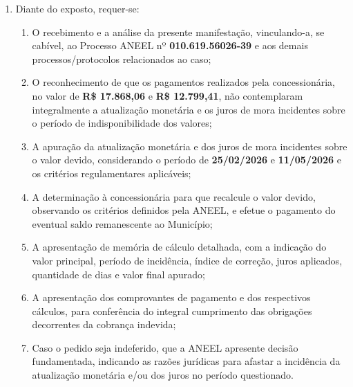 \begin{enumerate}[resume]
\item Diante do exposto, requer-se:
    \begin{enumerate}
    \item O recebimento e a análise da presente manifestação, vinculando-a, se cabível, ao Processo ANEEL nº \textbf{010.619.56026-39} e aos demais processos/protocolos relacionados ao caso;

    \item O reconhecimento de que os pagamentos realizados pela concessionária, no valor de \textbf{R\$ 17.868,06} e \textbf{R\$ 12.799,41}, não contemplaram integralmente a atualização monetária e os juros de mora incidentes sobre o período de indisponibilidade dos valores;

    \item A apuração da atualização monetária e dos juros de mora incidentes sobre o valor devido, considerando o período de \textbf{25/02/2026} e \textbf{11/05/2026} e os critérios regulamentares aplicáveis;

    \item A determinação à concessionária para que recalcule o valor devido, observando os critérios definidos pela ANEEL, e efetue o pagamento do eventual saldo remanescente ao Município;

    \item A apresentação de memória de cálculo detalhada, com a indicação do valor principal, período de incidência, índice de correção, juros aplicados, quantidade de dias e valor final apurado;

    \item A apresentação dos comprovantes de pagamento e dos respectivos cálculos, para conferência do integral cumprimento das obrigações decorrentes da cobrança indevida;

    \item Caso o pedido seja indeferido, que a ANEEL apresente decisão fundamentada, indicando as razões jurídicas para afastar a incidência da atualização monetária e/ou dos juros no período questionado.
\end{enumerate}

\end{enumerate}